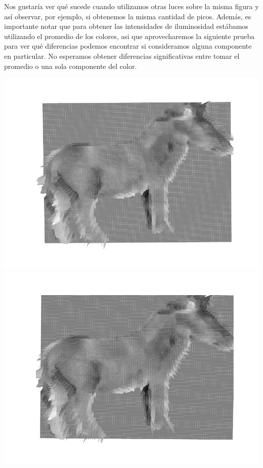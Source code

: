 Nos gustaría ver qué sucede cuando utilizamos otras luces sobre la misma figura y así observar, por ejemplo, si obtenemos la misma cantidad de picos. Además, es importante notar que para obtener las intensidades de iluminosidad estábamos utilizando el promedio de los colores, asi que aprovecharemos la siguiente prueba para ver qué diferencias podemos encontrar si consideramos alguna componente en particular. No esperamos obtener diferencias significativas entre tomar el promedio o una sola componente del color.



{\centering
    \includegraphics[scale=0.5]{informe/imagenes/profundidades/profCaballo012ColorProm.pdf}
    \includegraphics[scale=0.49]{informe/imagenes/profundidades/profCaballo012ColorAzul.pdf}
}
